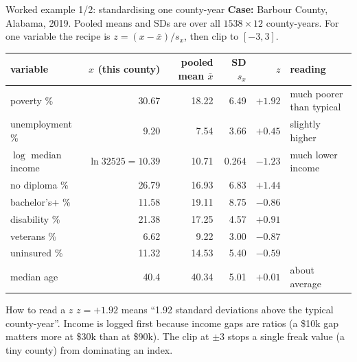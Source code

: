 ﻿\documentclass[9pt,aspectratio=169]{beamer}
\begin{document}
\begin{frame}{Worked example 1/2: standardising one county-year}
 \textbf{Case:} Barbour County, Alabama, 2019. Pooled means and SDs are over all $1538\times12$ county-years. For one variable the recipe is $z=(x-\bar x)/s_x$, then clip to $[-3,3]$.
 \par\smallskip
 \footnotesize\renewcommand{\arraystretch}{1.12}
 \begin{tabular}{@{}l r r r r l@{}}
 \toprule variable & $x$ (this county) & pooled mean $\bar x$ & SD $s_x$ & $z$ & reading\\\midrule
 poverty \% & 30.67 & 18.22 & 6.49 & $+1.92$ & much poorer than typical\\
 unemployment \% & 9.20 & 7.54 & 3.66 & $+0.45$ & slightly higher\\
 $\log$ median income & $\ln 32525=10.39$ & 10.71 & 0.264 & $-1.23$ & much lower income\\
 no diploma \% & 26.79 & 16.93 & 6.83 & $+1.44$ & \\
 bachelor's+ \% & 11.58 & 19.11 & 8.75 & $-0.86$ & \\
 disability \% & 21.38 & 17.25 & 4.57 & $+0.91$ & \\
 veterans \% & 6.62 & 9.22 & 3.00 & $-0.87$ & \\
 uninsured \% & 11.32 & 14.53 & 5.40 & $-0.59$ & \\
 median age & 40.4 & 40.34 & 5.01 & $+0.01$ & about average\\
 \bottomrule\end{tabular}
 \par\smallskip
 \begin{block}{How to read a $z$}\small
  $z=+1.92$ means ``1.92 standard deviations above the typical county-year''. Income is logged first because income gaps are ratios (a \$10k gap matters more at \$30k than at \$90k). The clip at $\pm3$ stops a single freak value (a tiny county) from dominating an index.
 \end{block}
\end{frame}
\end{document}
